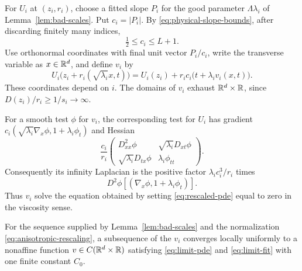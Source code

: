 For $U_i$ at $(z_i,r_i)$, choose a fitted slope $P_i$ for the good parameter $\Lambda\lambda_i$ of Lemma~\ref{lem:bad-scales}. Put $c_i=|P_i|$. By \eqref{eq:physical-slope-bounds}, after discarding finitely many indices,
\begin{equation}\label{eq:base-norm-bounds}
  \tfrac12\le c_i\le L+1.
\end{equation}
Use orthonormal coordinates with final unit vector $P_i/c_i$, write the transverse variable as $x\in\mathbb{R}^d$, and define $v_i$ by
\begin{equation}\label{eq:anisotropic-rescaling}
  U_i\bigl(z_i+r_i(\sqrt{\lambda_i}x,t)\bigr)
   =U_i(z_i)+r_i c_i\bigl(t+\lambda_i v_i(x,t)\bigr).
\end{equation}
These coordinates depend on $i$. The domains of $v_i$ exhaust $\mathbb{R}^d\times\mathbb{R}$, since $D(z_i)/r_i\ge1/s_i\to\infty$.

For a smooth test $\phi$ for $v_i$, the corresponding test for $U_i$ has gradient $c_i(\sqrt{\lambda_i}\nabla_x\phi,1+\lambda_i\phi_t)$ and Hessian
\[
  \frac{c_i}{r_i}
  \begin{pmatrix}
    D^2_{xx}\phi&\sqrt{\lambda_i}D_{xt}\phi\\
    \sqrt{\lambda_i}D_{tx}\phi&\lambda_i\phi_{tt}
  \end{pmatrix}.
\]
Consequently its infinity Laplacian is the positive factor $\lambda_i c_i^3/r_i$ times
\begin{equation}\label{eq:rescaled-pde}
  D^2\phi[(\nabla_x\phi,1+\lambda_i\phi_t)].
\end{equation}
Thus $v_i$ solve the equation obtained by setting \eqref{eq:rescaled-pde} equal to zero in the viscosity sense.

\begin{proposition}\label{prop:nonaffine-limit}
For the sequence supplied by Lemma~\ref{lem:bad-scales} and the normalization \eqref{eq:anisotropic-rescaling}, a subsequence of the $v_i$ converges locally uniformly to a nonaffine function $v\in C(\mathbb{R}^d\times\mathbb{R})$ satisfying \eqref{eq:limit-pde} and \eqref{eq:limit-fit} with one finite constant $C_0$.
\end{proposition}

